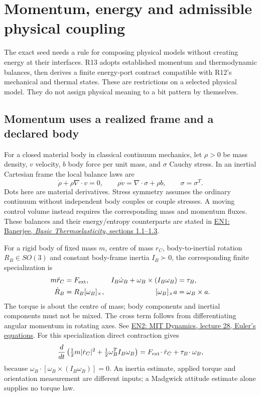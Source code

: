 \section{Momentum, energy and admissible physical coupling}
\label{sec:r13-energy}
The exact seed needs a rule for composing physical models without creating
energy at their interfaces. R13 adopts established momentum and thermodynamic
balances, then derives a finite energy-port contract compatible with R12's
mechanical and thermal states. These are restrictions on a selected physical
model. They do not assign physical meaning to a bit pattern by themselves.

\subsection{Momentum uses a realized frame and a declared body}
For a closed material body in classical continuum mechanics, let $\rho>0$
be mass density, $v$ velocity, $b$ body force per unit mass, and $\sigma$
Cauchy stress. In an inertial Cartesian frame the local balance laws are
\begin{equation}
 \dot\rho+\rho\nabla\!\cdot v=0,\qquad
 \rho\dot v=\nabla\!\cdot\sigma+\rho b,\qquad \sigma=\sigma^T.
 \label{eq:r13-momentum}
\end{equation}
Dots here are material derivatives. Stress symmetry assumes the ordinary
continuum without independent body couples or couple stresses. A moving
control volume instead requires the corresponding mass and momentum fluxes.
These balances and their energy/entropy counterparts are stated in
\href{https://www.eng.utah.edu/~banerjee/Notes/ThermoElastic.pdf}
{EN1: Banerjee, \emph{Basic Thermoelasticity}, sections 1.1--1.3}.

For a rigid body of fixed mass $m$, centre of mass $r_C$, body-to-inertial
rotation $R_B\in SO(3)$ and constant body-frame inertia $I_B\succ0$,
the corresponding finite specialization is
\begin{align}
 m\ddot r_C&=F_{\rm ext},&
 I_B\dot\omega_B+\omega_B\times(I_B\omega_B)&=\tau_B,\\
 \dot R_B&=R_B[\omega_B]_\times,&
 [\omega_B]_\times a&=\omega_B\times a .
 \label{eq:r13-euler}
\end{align}
The torque is about the centre of mass; body components and inertial
components must not be mixed. The cross term follows from differentiating
angular momentum in rotating axes. See
\href{https://ocw.mit.edu/courses/16-07-dynamics-fall-2009/5e1d8699338146e5127080b880b906d6_MIT16_07F09_Lec28.pdf}
{EN2: MIT Dynamics, lecture 28, Euler's equations}.
For this specialization direct contraction gives
\begin{equation}
 \frac{d}{dt}\left(\tfrac12m|\dot r_C|^2+
                 \tfrac12\omega_B^TI_B\omega_B\right)
   =F_{\rm ext}\!\cdot\dot r_C+\tau_B\!\cdot\omega_B,
 \label{eq:r13-rigid-power}
\end{equation}
because $\omega_B\cdot[\omega_B\times(I_B\omega_B)]=0$.
An inertia estimate, applied torque and orientation measurement are different
inputs; a Madgwick attitude estimate alone supplies no torque law.

